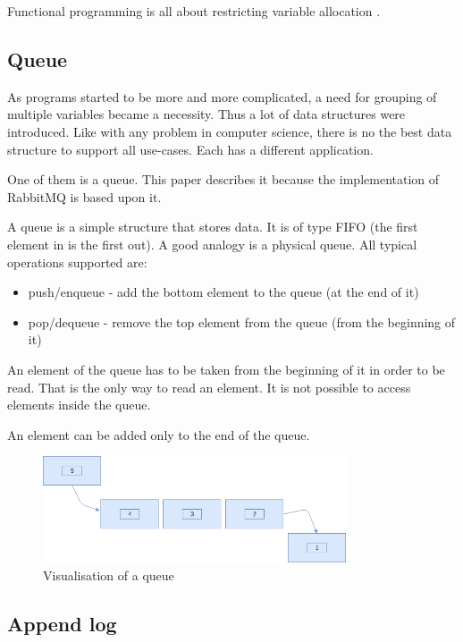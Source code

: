 Functional programming is all about restricting variable allocation  \cite{cleanArch}. 

\subsection{Queue}
\label{subsec:queue}

As programs started to be more and more complicated, a need for grouping of multiple variables became a necessity. Thus a lot of data structures were introduced. Like with any problem in computer science, there is no the best data structure to support all use-cases. Each has a different application.

One of them is a queue. This paper describes it because the implementation of RabbitMQ is based upon it. 

A queue is a simple structure that stores data. It is of type FIFO (the first element in is the first out). A good analogy is a physical queue. All typical operations supported are:
\begin{itemize}
\item push/enqueue - add the bottom element to the queue (at the end of it) 
\item pop/dequeue - remove the top element from the queue (from the beginning of it) 
\end{itemize}

An element of the queue has to be taken from the beginning of it in order to be read. That is the only way to read an element. It is not possible to access elements inside the queue. 

An element can be added only to the end of the queue. 


\begin{figure}[h!]
 \centering
  \includegraphics[width=0.8\textwidth]{pictures/que.png}
  \caption{Visualisation of a queue}
  \label{fig:queue}
\end{figure}


\subsection{Append log}
\label{subsec:log}

